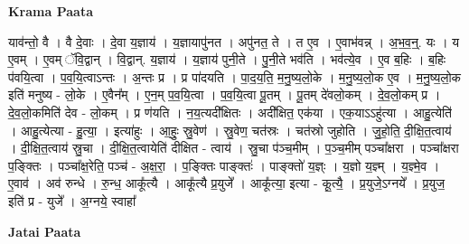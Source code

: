\documentclass[17pt]{extarticle}
\begin{document}
\textbf{Krama Paata} \newline

याव॑न्तो॒ वै । वै दे॒वाः । दे॒वा य॒ज्ञाय॑ । य॒ज्ञायापु॑नत । अपु॑नत॒ ते । त ए॒व । ए॒वाभ॑वन्न् । अ॒भ॒व॒न्॒. यः । य ए॒वम् । ए॒वम् ॅवि॒द्वान् । वि॒द्वान्. य॒ज्ञाय॑ । य॒ज्ञाय॑ पुनी॒ते । पु॒नी॒ते भव॑ति । भव॑त्ये॒व । ए॒व ब॒हिः । ब॒हिः प॑वयि॒त्वा । प॒व॒यि॒त्वाऽन्तः । अ॒न्तः प्र । प्र पा॑दयति । पा॒द॒य॒ति॒ म॒नु॒ष्य॒लो॒के । म॒नु॒ष्य॒लो॒क ए॒व । म॒नु॒ष्य॒लो॒क इति॑ मनुष्य - लो॒के । ए॒वैन᳚म् । ए॒न॒म् प॒व॒यि॒त्वा । प॒व॒यि॒त्वा पू॒तम् । पू॒तम् दे॑वलो॒कम् । दे॒व॒लो॒कम् प्र । दे॒व॒लो॒कमिति॑ देव - लो॒कम् । प्र ण॑यति । न॒य॒त्यदी᳚क्षितः । अदी᳚क्षित॒ एक॑या । एक॒याऽऽहु॑त्या । आहु॒त्येति॑ । आहु॒त्येत्या - हु॒त्या॒ । इत्या॑हुः । आ॒हुः॒ स्रु॒वेण॑ । स्रु॒वेण॒ चत॑स्रः । चत॑स्रो जुहोति । जु॒हो॒ति॒ दी॒क्षि॒त॒त्वाय॑ । दी॒क्षि॒त॒त्वाय॑ स्रु॒चा । दी॒क्षि॒त॒त्वायेति॑ दीक्षित - त्वाय॑ । स्रु॒चा प॑ञ्च॒मीम् । प॒ञ्च॒मीम् पञ्चा᳚क्षरा । पञ्चा᳚क्षरा प॒ङ्‍क्तिः । पञ्चा᳚क्ष॒रेति॒ पञ्च॑ - अ॒क्ष॒रा॒ । प॒ङ्‍क्तिः पाङ्‍क्तः॑ । पाङ्‍क्तो॑ य॒ज्ञ्ः । य॒ज्ञो य॒ज्ञ्म् । य॒ज्ञ्मे॒व । ए॒वाव॑ । अव॑ रुन्धे । रु॒न्ध॒ आकू᳚त्यै । आकू᳚त्यै प्र॒युजे᳚ । आकू᳚त्या॒ इत्या - कू॒त्यै॒ । प्र॒युजे॒ऽग्नये᳚ । प्र॒युज॒ इति॑ प्र - युजे᳚ । अ॒ग्नये॒ स्वाहा᳚ \newline

\textbf{Jatai Paata} \newline
\end{document}
